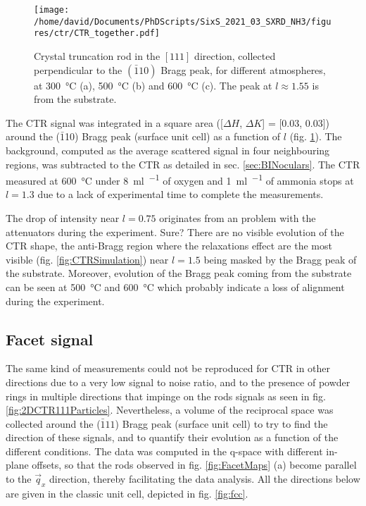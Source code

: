 \begin{figure}[!htb]
    \centering
    \texttt{[image: /home/david/Documents/PhDScripts/SixS\_2021\_03\_SXRD\_NH3/figures/ctr/CTR\_together.pdf]}
    \caption{
        Crystal truncation rod in the $[111]$ direction, collected perpendicular to the $(\bar{1}10)$ Bragg peak, for different atmospheres, at \qty{300}{\degreeCelsius} (a), \qty{500}{\degreeCelsius} (b) and \qty{600}{\degreeCelsius} (c).
        The peak at $l\approx1.55$ is from the  substrate.
    }
    \label{fig:CTR111Particles}
\end{figure}

The CTR signal was integrated in a square area ([$\Delta H$, $\Delta K$] = [0.03, 0.03]) around the ($\bar{1}$10) Bragg peak (surface unit cell) as a function of $l$ (fig. \ref{fig:CTR111Particles}).
The background, computed as the average scattered signal in four neighbouring regions, was subtracted to the CTR as detailed in sec. \ref{sec:BINoculars}.
The CTR measured at \qty{600}{\degreeCelsius} under \qty{8}{\ml\per\min} of oxygen and \qty{1}{\ml\per\min} of ammonia stops at $l=1.3$ due to a lack of experimental time to complete the measurements.

The drop of intensity near $l=0.75$ originates from an problem with the attenuators during the experiment.
\textcolor{Important}{Sure?}
There are no visible evolution of the CTR shape, the anti-Bragg region where the relaxations effect are the most visible (fig. \ref{fig:CTRSimulation}) near $l=1.5$ being masked by the Bragg peak of the substrate.
Moreover, evolution of the Bragg peak coming from the substrate can be seen at \qty{500}{\degreeCelsius} and \qty{600}{\degreeCelsius} which probably indicate a loss of alignment during the experiment.

\subsection{Facet signal}

The same kind of measurements could not be reproduced for CTR in other directions due to a very low signal to noise ratio, and to the presence of powder rings in multiple directions that impinge on the rods signals as seen in fig. \ref{fig:2DCTR111Particles}.
Nevertheless, a volume of the reciprocal space was collected around the ($\bar{1}11$) Bragg peak (surface unit cell) to try to find the direction of these signals, and to quantify their evolution as a function of the different conditions.
The data was computed in the q-space with different in-plane offsets, so that the rods observed in fig. \ref{fig:FacetMaps} (a) become parallel to the $\vec{q}_x$ direction, thereby facilitating the data analysis.
All the directions below are given in the classic unit cell, depicted in fig. \ref{fig:fcc}.

